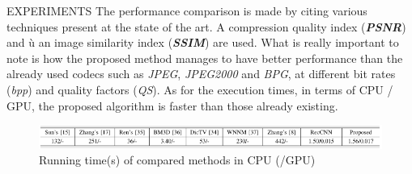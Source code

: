 \documentclass[10pt]{beamer}
\begin{document}
\begin{frame}{EXPERIMENTS}
    The performance comparison is made by citing various techniques present 
    at the state of the art. A compression quality index ({\bfseries\emph{PSNR}}) and ù
    an image similarity index ({\bfseries\emph{SSIM}}) are used. What is really important to note 
    is how the proposed method manages to have better performance than 
    the already used codecs such as \emph{JPEG}, \emph{JPEG2000} and \emph{BPG}, at different 
    bit rates (\emph{bpp}) and quality factors (\emph{QS}). As for the execution times, in 
    terms of CPU / GPU, the proposed algorithm is faster than those already 
    existing.
    \begin{figure}[htbp]
        \centering
        \includegraphics[width = 1 \linewidth]{images/paper3/time.png}
        \centering
        \caption{Running time(s) of compared methods in CPU (/GPU) }
        \label{fig:time}
    \end{figure}
\end{frame}
\end{document}
